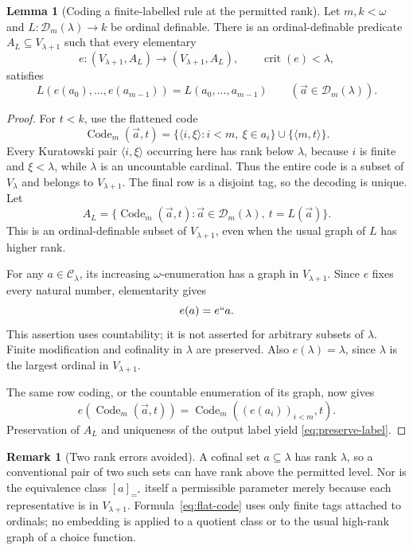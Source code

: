 \documentclass[11pt,letterpaper]{article}
\theoremstyle{definition}
\newtheorem{lemma}[definition]{Lemma}
\newcommand{\crit}{\operatorname{crit}}
\newtheorem{remark}[definition]{Remark}
\newcommand{\CC}{\mathcal C}
\newcommand{\DD}{\mathcal D}
\newcommand{\Code}{\operatorname{Code}}
\begin{document}
\begin{lemma}[Coding a finite-labelled rule at the permitted rank]\label{lem:flatcode}
Let $m,k<\omega$ and $L:\DD_m(\lambda)\to k$ be ordinal definable. There is an ordinal-definable predicate $A_L\subseteq V_{\lambda+1}$ such that every elementary
\[
 e:(V_{\lambda+1},A_L)\longrightarrow(V_{\lambda+1},A_L),
 \qquad \crit(e)<\lambda,
\]
satisfies
\begin{equation}\label{eq:preserve-label}
 L(e(a_0),\ldots,e(a_{m-1}))=L(a_0,\ldots,a_{m-1})
 \qquad(\vec a\in\DD_m(\lambda)).
\end{equation}
\end{lemma}

\begin{proof}
For $t<k$, use the flattened code
\begin{equation}\label{eq:flat-code}
 \Code_m(\vec a,t)=
 \{\langle i,\xi\rangle:i<m,\ \xi\in a_i\}
          \cup\{\langle m,t\rangle\}.
\end{equation}
Every Kuratowski pair $\langle i,\xi\rangle$ occurring here has rank below $\lambda$, because $i$ is finite and $\xi<\lambda$, while $\lambda$ is an uncountable cardinal. Thus the entire code is a subset of $V_\lambda$ and belongs to $V_{\lambda+1}$. The final row is a disjoint tag, so the decoding is unique. Let
\[
 A_L=\{\Code_m(\vec a,t):\vec a\in\DD_m(\lambda),\ t=L(\vec a)\}.
\]
This is an ordinal-definable subset of $V_{\lambda+1}$, even when the usual graph of $L$ has higher rank.

For any $a\in\CC_\lambda$, its increasing $\omega$-enumeration has a graph in $V_{\lambda+1}$. Since $e$ fixes every natural number, elementarity gives
\begin{equation}\label{eq:countable-image}
 e(a)=e``a.
\end{equation}
This assertion uses countability; it is not asserted for arbitrary subsets of $\lambda$. Finite modification and cofinality in $\lambda$ are preserved. Also $e(\lambda)=\lambda$, since $\lambda$ is the largest ordinal in $V_{\lambda+1}$.

The same row coding, or the countable enumeration of its graph, now gives
\[
 e(\Code_m(\vec a,t))=
       \Code_m((e(a_i))_{i<m},t).
\]
Preservation of $A_L$ and uniqueness of the output label yield \eqref{eq:preserve-label}.
\end{proof}

\begin{remark}[Two rank errors avoided]
A cofinal set $a\subseteq\lambda$ has rank $\lambda$, so a conventional pair of two such sets can have rank above the permitted level. Nor is the equivalence class $[a]_{=^*}$ itself a permissible parameter merely because each representative is in $V_{\lambda+1}$. Formula~\eqref{eq:flat-code} uses only finite tags attached to ordinals; no embedding is applied to a quotient class or to the usual high-rank graph of a choice function.
\end{remark}
\end{document}
